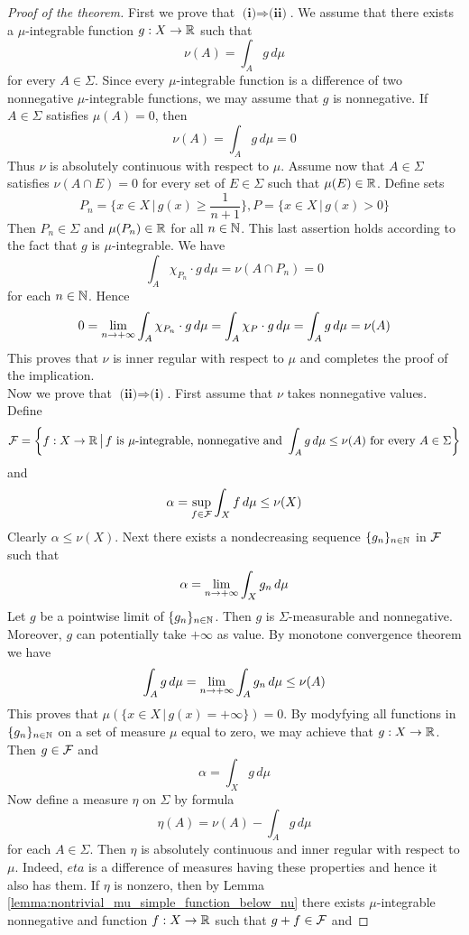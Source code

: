 \begin{proof}[Proof of the theorem]
    First we prove that $\textbf{(i)}\Rightarrow \textbf{(ii)}$. We assume that there exists a $\mu$-integrable function $g:X\rightarrow {\mathbb R}$ such that
    $$\nu(A) = \int_Ag\,d\mu$$
    for every $A\in \Sigma$. Since every $\mu$-integrable function is a difference of two nonnegative $\mu$-integrable functions, we may assume that $g$ is nonnegative. If $A \in \Sigma$ satisfies $\mu(A) = 0$, then
    $$\nu(A) = \int_Ag\,d\mu = 0$$
    Thus $\nu$ is absolutely continuous with respect to $\mu$. Assume now that $A \in \Sigma$ satisfies $\nu(A\cap E) = 0$ for every set of $E \in \Sigma$ such that $\mu(E) \in {\mathbb R}$. Define sets
    $$P_n = \bigg\{x\in X\,\bigg|\,g(x) \geq \frac{1}{n + 1}\bigg\}, P = \bigg\{x\in X\,\bigg|\,g(x) > 0\bigg\}$$
    Then $P_n \in \Sigma$ and $\mu(P_n) \in {\mathbb R}$ for all $n \in {\mathbb N}$. This last assertion holds according to the fact that $g$ is $\mu$-integrable. We have
    $$\int_{A}\chi_{P_n}\cdot g\,d\mu = \nu(A\cap P_n) = 0$$
    for each $n \in {\mathbb N}$. Hence
    $$0 = \lim_{n\rightarrow +\infty}\int_A\chi_{P_n}\cdot g\,d\mu = \int_A\chi_P\cdot g\,d\mu = \int_Ag\,d\mu = \nu(A)$$
    This proves that $\nu$ is inner regular with respect to $\mu$ and completes the proof of the implication.\\
    Now we prove that $\textbf{(ii)}\Rightarrow \textbf{(i)}$. First assume that $\nu$ takes nonnegative values. Define
    $${\mathcal F} = \bigg\{f:X\rightarrow {\mathbb R}\,\big|\,f\mbox{ is }\mu\mbox{-integrable, nonnegative and }\int_Ag\,d\mu \leq \nu(A)\mbox{ for every }A \in \Sigma\bigg\}$$
    and
    $$\alpha = \sup_{f \in {\mathcal F}}\int_Xf\,d\mu \leq \nu(X)$$
    Clearly $\alpha \leq \nu(X)$. Next there exists a nondecreasing sequence $\{g_n\}_{n\in {\mathbb N}}$ in ${\mathcal F}$ such that
    $$\alpha = \lim_{n\rightarrow +\infty}\int_Xg_n\,d\mu$$
    Let $g$ be a pointwise limit of $\{g_n\}_{n\in {\mathbb N}}$. Then $g$ is $\Sigma$-measurable and nonnegative. Moreover, $g$ can potentially take $+\infty$ as value. By monotone convergence theorem we have
    $$\int_Ag\,d\mu = \lim_{n\rightarrow +\infty}\int_Ag_n\,d\mu \leq \nu(A)$$
    This proves that $\mu(\{x\in X\,|\,g(x) = +\infty\}) = 0$. By modyfying all functions in $\{g_n\}_{n\in {\mathbb N}}$ on a set of measure $\mu$ equal to zero, we may achieve that $g:X \rightarrow {\mathbb R}$. Then $g \in {\mathcal F}$ and
    $$\alpha = \int_Xg\,d\mu$$
    Now define a measure $\eta$ on $\Sigma$ by formula
    $$\eta(A) = \nu(A) - \int_Ag\,d\mu$$
    for each $A \in \Sigma$. Then $\eta$ is absolutely continuous and inner regular with respect to $\mu$. Indeed, $eta$ is a difference of measures having these properties and hence it also has them. If $\eta$ is nonzero, then by Lemma \ref{lemma:nontrivial_mu_simple_function_below_nu} there exists $\mu$-integrable nonnegative and function $f:X\rightarrow {\mathbb R}$ such that $g + f \in {\mathcal F}$ and

\end{proof}
